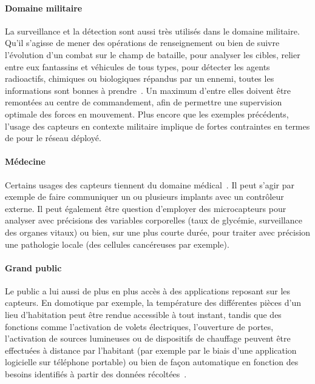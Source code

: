         \paragraph{Domaine militaire}
La surveillance et la détection sont aussi très utilisés dans le domaine militaire.
Qu'il s'agisse de mener des opérations de renseignement ou bien de suivre l'évolution d'un combat sur le champ de bataille, pour analyser les cibles, relier entre eux fantassins et véhicules de tous types, pour détecter les agents radioactifs, chimiques ou biologiques répandus par un ennemi, toutes les informations sont bonnes à prendre~\cite{ASSC02}.
Un maximum d'entre elles doivent être remontées au centre de commandement, afin de permettre une supervision optimale des forces en mouvement.
Plus encore que les exemples précédents, l'usage des capteurs en contexte militaire implique de fortes contraintes en termes de \secu pour le réseau déployé.

        \paragraph{Médecine}
Certains usages des capteurs tiennent du domaine médical~\cite{SZFDXC14}.
Il peut s'agir par exemple de faire communiquer un ou plusieurs implants avec un contrôleur externe.
Il peut également être question d'employer des microcapteurs pour analyser avec précisions des variables corporelles (taux de glycémie, surveillance des organes vitaux) ou bien, sur une plus courte durée, pour traiter avec précision une pathologie locale (des cellules cancéreuses par exemple).

        \paragraph{Grand public}
Le public a lui aussi de plus en plus accès à des applications reposant sur les capteurs.
En domotique par exemple, la température des différentes pièces d'un lieu d'habitation peut être rendue accessible à tout instant, tandis que des fonctions comme l'activation de volets électriques, l'ouverture de portes, l'activation de sources lumineuses ou de dispositifs de chauffage peuvent être effectuées à distance par l'habitant (par exemple par le biais d'une application logicielle sur téléphone portable) ou bien de façon automatique en fonction des besoins identifiés à partir des données récoltées~\cite{ASSC02}.

